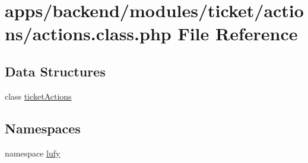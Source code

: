 \hypertarget{backend_2modules_2ticket_2actions_2actions_8class_8php}{\section{apps/backend/modules/ticket/actions/actions.class.\-php File Reference}
\label{backend_2modules_2ticket_2actions_2actions_8class_8php}
}
\subsection*{Data Structures}
\begin{DoxyCompactItemize}
\item 
class \hyperlink{classticket_actions}{ticket\-Actions}
\end{DoxyCompactItemize}
\subsection*{Namespaces}
\begin{DoxyCompactItemize}
\item 
namespace \hyperlink{namespacelufy}{lufy}
\end{DoxyCompactItemize}

